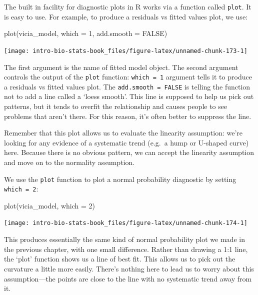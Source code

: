 \documentclass[
]{book}
\newenvironment{Shaded}{\begin{snugshade}}{\end{snugshade}}
\newcommand{\AttributeTok}[1]{\textcolor[rgb]{0.77,0.63,0.00}{#1}}
\newcommand{\ConstantTok}[1]{\textcolor[rgb]{0.00,0.00,0.00}{#1}}
\newcommand{\DecValTok}[1]{\textcolor[rgb]{0.00,0.00,0.81}{#1}}
\newcommand{\FunctionTok}[1]{\textcolor[rgb]{0.00,0.00,0.00}{#1}}
\newcommand{\NormalTok}[1]{#1}
\begin{document}
The built in facility for diagnostic plots in R works via a function called \texttt{plot}. It is easy to use. For example, to produce a residuals vs fitted values plot, we use:

\begin{Shaded}
\begin{Highlighting}[]
\FunctionTok{plot}\NormalTok{(vicia\_model, }\AttributeTok{which =} \DecValTok{1}\NormalTok{, }\AttributeTok{add.smooth =} \ConstantTok{FALSE}\NormalTok{)}
\end{Highlighting}
\end{Shaded}

\begin{center}\texttt{[image: intro-bio-stats-book\_files/figure-latex/unnamed-chunk-173-1]} \end{center}

The first argument is the name of fitted model object. The second argument controls the output of the \texttt{plot} function: \texttt{which\ =\ 1} argument tells it to produce a residuals vs fitted values plot. The \texttt{add.smooth\ =\ FALSE} is telling the function not to add a line called a `loess smooth'. This line is supposed to help us pick out patterns, but it tends to overfit the relationship and causes people to see problems that aren't there. For this reason, it's often better to suppress the line.

Remember that this plot allows us to evaluate the linearity assumption: we're looking for any evidence of a systematic trend (e.g.~a hump or U-shaped curve) here. Because there is no obvious pattern, we can accept the linearity assumption and move on to the normality assumption.

We use the \texttt{plot} function to plot a normal probability diagnostic by setting \texttt{which\ =\ 2}:

\begin{Shaded}
\begin{Highlighting}[]
\FunctionTok{plot}\NormalTok{(vicia\_model, }\AttributeTok{which =} \DecValTok{2}\NormalTok{)}
\end{Highlighting}
\end{Shaded}

\begin{center}\texttt{[image: intro-bio-stats-book\_files/figure-latex/unnamed-chunk-174-1]} \end{center}

This produces essentially the same kind of normal probability plot we made in the previous chapter, with one small difference. Rather than drawing a 1:1 line, the `plot' function shows us a line of best fit. This allows us to pick out the curvature a little more easily. There's nothing here to lead us to worry about this assumption---the points are close to the line with no systematic trend away from it.
\end{document}
